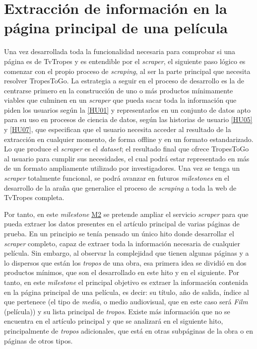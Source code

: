 \section{Extracción de información en la página principal de una película}
Una vez desarrollada toda la funcionalidad necesaria para comprobar si una
página es de TvTropes y es entendible por el \textit{scraper}, el siguiente paso
lógico es comenzar con el propio proceso de \textit{scraping}, al ser la parte
principal que necesita resolver TropesToGo. La estrategia a seguir en el proceso
de desarrollo es la de centrarse primero en la construcción de uno o más
productos mínimamente viables que culminen en un \textit{scraper} que pueda
sacar toda la información que piden los usuarios según la
\href{https://github.com/jlgallego99/TropesToGo/issues/6}{[HU01]} y
representarlos en un conjunto de datos apto para su uso en procesos de ciencia
de datos, según las historias de usuario
\href{https://github.com/jlgallego99/TropesToGo/issues/30}{[HU05]} y
\href{https://github.com/jlgallego99/TropesToGo/issues/46}{[HU07]}, que
especifican que el usuario necesita acceder al resultado de la extracción en
cualquier momento, de forma offline y en un formato estandarizado. Lo que
produce el \textit{scraper} es el \textit{dataset}; el resultado final que
ofrece TropesToGo al usuario para cumplir sus necesidades, el cual podrá estar
representado en más de un formato ampliamente utilizado por investigadores. Una
vez se tenga un \textit{scraper} totalmente funcional, se podrá avanzar en
futuros \textit{milestones} en el desarrollo de la araña que generalice el
proceso de \textit{scraping} a toda la web de TvTropes completa. 

Por tanto, en este \textit{milestone}
\href{https://github.com/jlgallego99/TropesToGo/milestone/3}{M2} se pretende
ampliar el servicio \textit{scraper} para que pueda extraer los datos presentes
en el artículo principal de varias páginas de prueba. En un principio se tenía
pensado un único hito donde desarrollar el \textit{scraper} completo, capaz de
extraer toda la información necesaria de cualquier película. Sin embargo, al
observar la complejidad que tienen algunas páginas y a lo dispersos que están
los \textit{tropos} de una obra, esa primera idea se dividió en dos productos
mínimos, que son el desarrollado en este hito y en el siguiente. Por tanto, en
este \textit{milestone} el principal objetivo es extraer la información
contenida en la página principal de una película, es decir: su título, año de
salida, índice al que pertenece (el tipo de \textit{media}, o medio audiovisual,
que en este caso será \textit{Film} (película)) y su lista principal de
\textit{tropos}. Existe más información que no se encuentra en el artículo
principal y que se analizará en el siguiente hito, principalmente de
\textit{tropos} adicionales, que está en otras subpáginas de la obra o en
páginas de otros tipos.

